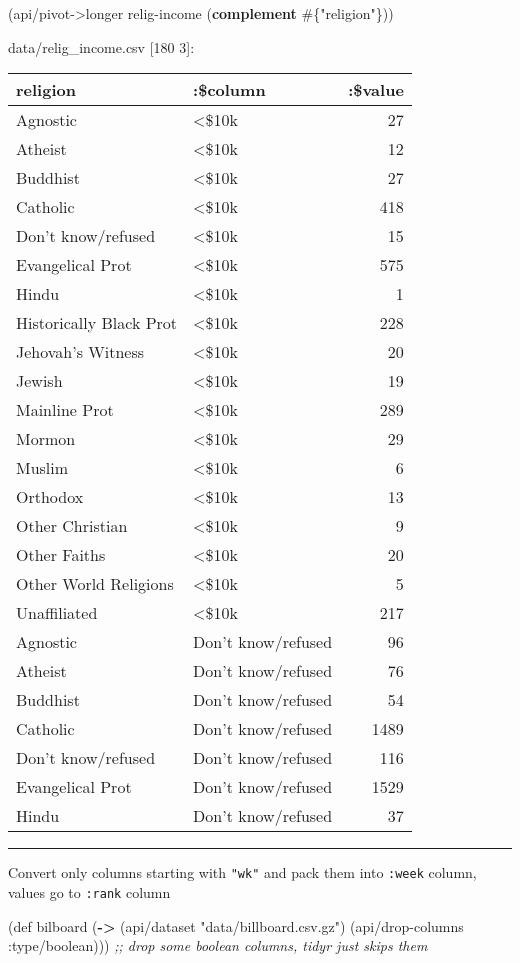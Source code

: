 \documentclass[]{article}
\newenvironment{Shaded}{\begin{snugshade}}{\end{snugshade}}
\newcommand{\KeywordTok}[1]{\textcolor[rgb]{0.13,0.29,0.53}{\textbf{#1}}}
\newcommand{\StringTok}[1]{\textcolor[rgb]{0.31,0.60,0.02}{#1}}
\newcommand{\CommentTok}[1]{\textcolor[rgb]{0.56,0.35,0.01}{\textit{#1}}}
\newcommand{\FunctionTok}[1]{\textcolor[rgb]{0.00,0.00,0.00}{#1}}
\newcommand{\BuiltInTok}[1]{#1}
\newcommand{\AttributeTok}[1]{\textcolor[rgb]{0.77,0.63,0.00}{#1}}
\newcommand{\NormalTok}[1]{#1}
\begin{document}
\begin{Shaded}
\begin{Highlighting}[]
\NormalTok{(api/pivot->longer relig-income (}\KeywordTok{complement}\NormalTok{ #\{}\StringTok{"religion"}\NormalTok{\}))}
\end{Highlighting}
\end{Shaded}

data/relig\_income.csv {[}180 3{]}:

\begin{longtable}[]{@{}llr@{}}
\toprule
religion & :\$column & :\$value\tabularnewline
\midrule
\endhead
Agnostic & \textless{}\$10k & 27\tabularnewline
Atheist & \textless{}\$10k & 12\tabularnewline
Buddhist & \textless{}\$10k & 27\tabularnewline
Catholic & \textless{}\$10k & 418\tabularnewline
Don't know/refused & \textless{}\$10k & 15\tabularnewline
Evangelical Prot & \textless{}\$10k & 575\tabularnewline
Hindu & \textless{}\$10k & 1\tabularnewline
Historically Black Prot & \textless{}\$10k & 228\tabularnewline
Jehovah's Witness & \textless{}\$10k & 20\tabularnewline
Jewish & \textless{}\$10k & 19\tabularnewline
Mainline Prot & \textless{}\$10k & 289\tabularnewline
Mormon & \textless{}\$10k & 29\tabularnewline
Muslim & \textless{}\$10k & 6\tabularnewline
Orthodox & \textless{}\$10k & 13\tabularnewline
Other Christian & \textless{}\$10k & 9\tabularnewline
Other Faiths & \textless{}\$10k & 20\tabularnewline
Other World Religions & \textless{}\$10k & 5\tabularnewline
Unaffiliated & \textless{}\$10k & 217\tabularnewline
Agnostic & Don't know/refused & 96\tabularnewline
Atheist & Don't know/refused & 76\tabularnewline
Buddhist & Don't know/refused & 54\tabularnewline
Catholic & Don't know/refused & 1489\tabularnewline
Don't know/refused & Don't know/refused & 116\tabularnewline
Evangelical Prot & Don't know/refused & 1529\tabularnewline
Hindu & Don't know/refused & 37\tabularnewline
\bottomrule
\end{longtable}

\begin{center}\rule{0.5\linewidth}{0.5pt}\end{center}

Convert only columns starting with \texttt{"wk"} and pack them into
\texttt{:week} column, values go to \texttt{:rank} column

\begin{Shaded}
\begin{Highlighting}[]
\NormalTok{(}\BuiltInTok{def}\FunctionTok{ bilboard }\NormalTok{(}\KeywordTok{->}\NormalTok{ (api/dataset }\StringTok{"data/billboard.csv.gz"}\NormalTok{)}
\NormalTok{                  (api/drop-columns }\AttributeTok{:type/boolean}\NormalTok{))) }\CommentTok{;; drop some boolean columns, tidyr just skips them}
\end{Highlighting}
\end{Shaded}
\end{document}
